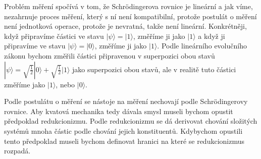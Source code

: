 Problém měření spočívá v tom, že Schrödingerova rovnice je lineární a jak víme, nezahrnuje proces měření, který s ní není kompatibilní, protože postulát o měření není jednotková operace, protože je nevratná, takže není lineární. Konkrétněji, když připravíme částici ve stavu $|\psi\rangle = |1\rangle$, změříme ji jako $|1\rangle$ a když ji připravíme ve stavu $|\psi\rangle = |0\rangle$, změříme ji jako $|1\rangle$. Podle lineárního evolučního zákonu bychom změřili částici připravenou v superpozici obou stavů $|\psi\rangle = \sqrt{\frac{1}{2}} |0\rangle + \sqrt{\frac{1}{2}} |1\rangle$ jako superpozici obou stavů, ale v realitě tuto částici změříme jako $|1\rangle$, nebo $|0\rangle$.

Podle postulátu o měření se nástoje na měření nechovají podle Schrödingerovy rovnice. Aby kvatová mechanika tedy dávala smysl museli bychom opustit předpoklad redukcionizmu. Podle redukcionizmu se dá derivovat chování složitých systémů mnoha částic podle chování jejich konstituentů. Kdybychom opustili tento předpoklad museli bychom definovat hranici na které se redukcionizmus rozpadá.



